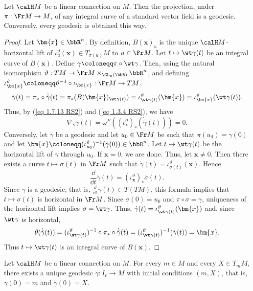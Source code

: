 \begin{prop}[{{\cite[Prop.~2.1.22]{RS2}}}]\label{prop 2.1.22 RS2}
    Let $\calH M$ be a linear connection on $M$. Then the projection, under $\pi:\Fr M\to M$, of any integral curve of a standard vector field is a geodesic. Conversely, every geodesic is obtained this way.
\end{prop}
\begin{proof}
    Let $\bm{x}\in\bbR^n$. By definition, $B(\bm{x})_u$ is the unique $\calH M$-horizontal lift of $\iota_u^\vartheta(\bm{x})\in T_{\pi(u)}M$ to $u\in\Fr M$. Let $t\mapsto \wt\gamma(t)$ be an integral curve of $B(\bm{x})$. Define $\gamma\coloneqq \pi\circ\wt\gamma$. Then, using the natural isomorphism $\vartheta:TM\to \Fr M\times_{\GL_n(\bbR)}\bbR^n$, and defining $\iota_{\bm{x}}^\vartheta\coloneqq \vartheta^{-1}\circ\iota_{\bm{x}}:\Fr M\to TM$,
    \[\dot\gamma(t)=\pi_\ast\circ \dot{\tilde\gamma}(t)=\pi_\ast(B(\bm{x})_{\wt\gamma(t)})=\iota_{\wt\gamma(t)}^\vartheta(\bm{x})=\iota_{\bm{x}}^\vartheta(\wt\gamma(t)).\]
    Thus, by (\ref{eq 1.7.13 RS2}) and (\ref{eq 1.3.4 RS2}), we have 
    \[\nabla_{\dot\gamma}\dot\gamma(t)=\omega^E\left((\iota_{\bm{x}}^\vartheta)_\ast \left(\dot{\tilde\gamma}(t)\right)\right)=0.\]
    Conversely, let $\gamma$ be a geodesic and let $u_0\in\Fr M$ be such that $\pi(u_0)=\gamma(0)$ and let $\bm{x}\coloneqq (\iota_{u_0}^\vartheta)^{-1}(\dot\gamma(0))\in\bbR^n$. Let $t\mapsto \wt\gamma(t)$ be the horizontal lift of $\gamma$ through $u_0$. If $\bm{x}=0$, we are done. Thus, let $\bm{x}\neq 0$. Then there exists a curve $t\mapsto \sigma(t)$ in $\Fr M$ such that $\dot\gamma(t)=\iota_{\sigma(t)}^\vartheta(\bm{x})$. Hence 
    \[\frac{\dd}{\dd t}\dot\gamma(t)=(\iota^\vartheta_{\bm{x}})_\ast\dot\sigma(t).\] 
    Since $\gamma$ is a geodesic, that is, $\frac{\dd}{\dd t}\dot\gamma(t)\in T(TM)$, this formula implies that $t\mapsto \sigma(t)$ is horizontal in $\Fr M$. Since $\sigma(0)=u_0$ and $\pi\circ \sigma=\gamma$, uniqueness of the horizontal lift implies $\sigma=\wt\gamma$. Thus, $\dot\gamma(t)=\iota_{\wt\gamma(t)}^\vartheta(\bm{x})$ and, since $\wt\gamma$ is horizontal,
    \[\theta(\dot{\tilde\gamma}(t))=(\iota_{\wt\gamma(t)}^\vartheta)^{-1}\circ\pi_\ast\circ\dot{\tilde\gamma}(t)=
    (\iota_{\wt\gamma(t)}^\vartheta)^{-1}(\dot\gamma(t))=\bm{x}.\]
    Thus $t\mapsto \wt\gamma(t)$ is an integral curve of $B(\bm{x})$.
\end{proof}

\begin{cor}[{{\cite[Cor.~2.1.23]{RS2}}}]\label{cor 2.1.23 RS2}
    Let $\calH M$ be a linear connection on $M$. For every $m\in M$ and every $X\in T_mM$, there exists a unique geodesic $\gamma:I_\epsilon\to M$ with initial conditions $(m,X)$, that is, $\gamma(0)=m$ and $\dot\gamma(0)=X$.
\end{cor}

